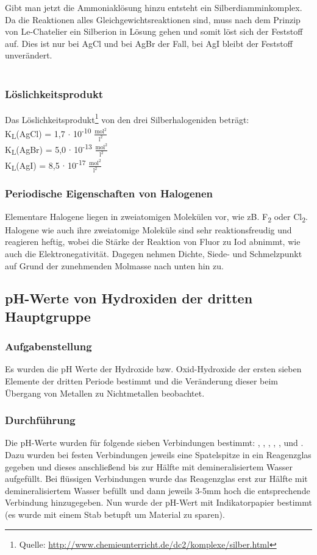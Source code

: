 \documentclass{scrartcl}
\begin{document}
Gibt man jetzt die Ammoniaklösung hinzu entsteht ein Silberdiamminkomplex. Da die Reaktionen alles Gleichgewichtsreaktionen sind, muss nach dem Prinzip von Le-Chatelier ein Silberion in Lösung gehen und somit löst sich der Feststoff auf. Dies ist nur bei AgCl und bei AgBr der Fall, bei AgI bleibt der Feststoff unverändert.\\ \\
\subsubsection{Löslichkeitsprodukt}
Das Löslichkeitsprodukt\footnote{Quelle: \url{http://www.chemieunterricht.de/dc2/komplexe/silber.html}} von den drei Silberhalogeniden beträgt:\\ 
K\textsubscript{L}(AgCl) = 1,7 $\cdot$ 10\textsuperscript{-10} $\frac{\text{mol}^2}{\text{l}^2}$\\
K\textsubscript{L}(AgBr) = 5,0 $\cdot$ 10\textsuperscript{-13} $\frac{\text{mol}^2}{\text{l}^2}$\\
K\textsubscript{L}(AgI) = 8,5 $\cdot$ 10\textsuperscript{-17} $\frac{\text{mol}^2}{\text{l}^2}$
\subsubsection{Periodische Eigenschaften von Halogenen}
Elementare Halogene liegen in zweiatomigen Molekülen vor, wie zB. F\textsubscript{2} oder Cl\textsubscript{2}. Halogene wie auch ihre zweiatomige Moleküle sind sehr reaktionsfreudig und reagieren heftig, wobei die Stärke der Reaktion von Fluor zu Iod abnimmt, wie auch die Elektronegativität. Dagegen nehmen Dichte, Siede- und Schmelzpunkt auf Grund der zunehmenden Molmasse nach unten hin zu.


 
\subsection{pH-Werte von Hydroxiden der dritten Hauptgruppe}
\subsubsection{Aufgabenstellung} 
Es wurden die pH Werte der Hydroxide bzw. Oxid-Hydroxide der ersten sieben Elemente der dritten Periode bestimmt und die Veränderung dieser beim Übergang von Metallen zu Nichtmetallen beobachtet.


\subsubsection{Durchführung} 
Die pH-Werte wurden für folgende sieben Verbindungen bestimmt: , , , , ,  und . Dazu wurden bei festen Verbindungen jeweils eine Spatelspitze in ein Reagenzglas gegeben und dieses anschließend bis zur Hälfte mit demineralisiertem Wasser aufgefüllt. Bei flüssigen Verbindungen wurde das Reagenzglas erst zur Hälfte mit demineralisiertem Wasser befüllt und dann jeweils 3-5mm hoch die entsprechende Verbindung hinzugegeben.
Nun wurde der pH-Wert mit Indikatorpapier bestimmt (es wurde mit einem Stab betupft um Material zu sparen).
\end{document}
